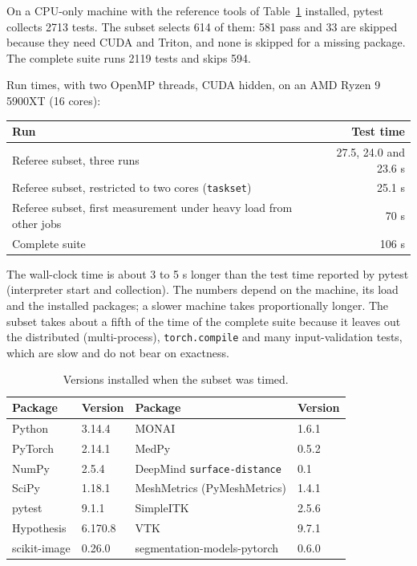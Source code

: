 On a CPU-only machine with the reference tools of Table~\ref{tab:versions} installed, pytest
collects 2713 tests. The subset selects 614 of them: 581 pass and 33 are skipped because they
need CUDA and Triton, and none is skipped for a missing package. The complete suite runs
2119 tests and skips 594.

Run times, with two OpenMP threads, CUDA hidden, on an AMD Ryzen 9 5900XT (16 cores):
\begin{center}
\small
\begin{tabular}{@{}lr@{}}
\toprule
Run & Test time \\
\midrule
Referee subset, three runs & 27.5, 24.0 and 23.6 s \\
Referee subset, restricted to two cores (\texttt{taskset}) & 25.1 s \\
Referee subset, first measurement under heavy load from other jobs & 70 s \\
Complete suite & 106 s \\
\bottomrule
\end{tabular}
\end{center}
The wall-clock time is about 3 to 5 s longer than the test time reported by pytest (interpreter
start and collection). The numbers depend on the machine, its load and the installed packages;
a slower machine takes proportionally longer. The subset takes about a fifth of the time of the
complete suite because it leaves out the distributed (multi-process), \texttt{torch.compile}
and many input-validation tests, which are slow and do not bear on exactness.

\begin{table}[ht]
\centering
\small
\begin{tabular}{@{}ll@{\qquad}ll@{}}
\toprule
Package & Version & Package & Version \\
\midrule
Python & 3.14.4 & MONAI & 1.6.1 \\
PyTorch & 2.14.1 & MedPy & 0.5.2 \\
NumPy & 2.5.4 & DeepMind \texttt{surface-distance} & 0.1 \\
SciPy & 1.18.1 & MeshMetrics (PyMeshMetrics) & 1.4.1 \\
pytest & 9.1.1 & SimpleITK & 2.5.6 \\
Hypothesis & 6.170.8 & VTK & 9.7.1 \\
scikit-image & 0.26.0 & segmentation-models-pytorch & 0.6.0 \\
\bottomrule
\end{tabular}
\caption{Versions installed when the subset was timed.}
\label{tab:versions}
\end{table}

